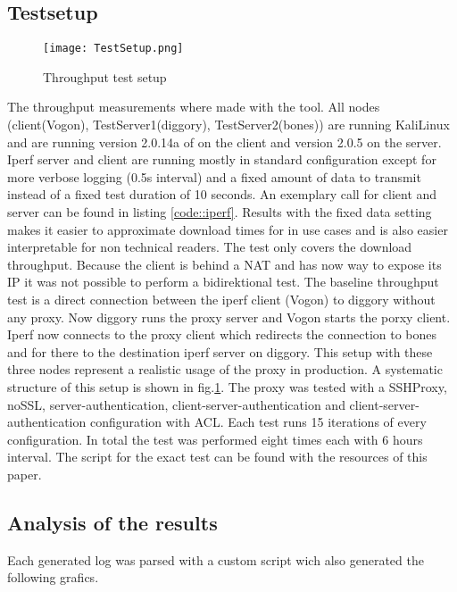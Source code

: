 \documentclass[12pt, a4paper]{scrartcl}
\begin{document}
\subsection{Testsetup}
\begin{figure}
    \centering
    \texttt{[image: TestSetup.png]}
    \caption{Throughput test setup}\label{fig::test}
\end{figure}
The throughput measurements where made with the  tool. All nodes (client(Vogon), TestServer1(diggory), TestServer2(bones)) are running KaliLinux and are running version 2.0.14a of  on the client and  version 2.0.5 on the server. Iperf server and client are running mostly in standard configuration except for more verbose logging (0.5s interval) and a fixed amount of data to transmit instead of a fixed test duration of 10 seconds. An exemplary call for client and server can be found in listing \ref{code::iperf}. Results with the fixed data setting makes it easier to approximate download times for in use cases and is also easier interpretable for non technical readers.\newline
The test only covers the download throughput. Because the client is behind a NAT and has now way to expose its IP it was not possible to perform a bidirektional test.\newline
The baseline throughput test is a direct connection between the iperf client (Vogon) to diggory without any proxy. Now diggory runs the proxy server and Vogon starts the porxy client. Iperf now connects to the proxy client which redirects the connection to bones and for there to the destination iperf server on diggory. This setup with these three nodes represent a realistic usage of the proxy in production. A systematic structure of this setup is shown in fig.\@\ref{fig::test}.\newline
The proxy was tested with a SSHProxy, noSSL, server-authentication, client-server-authentication and client-server-authentication configuration with \ac{ACL}. Each test runs 15 iterations of every configuration. In total the test was performed eight times each with 6 hours interval. The script for the exact test can be found with the resources of this paper.
\subsection{Analysis of the results}
Each generated log was parsed with a custom script wich also generated the following grafics.
\end{document}
